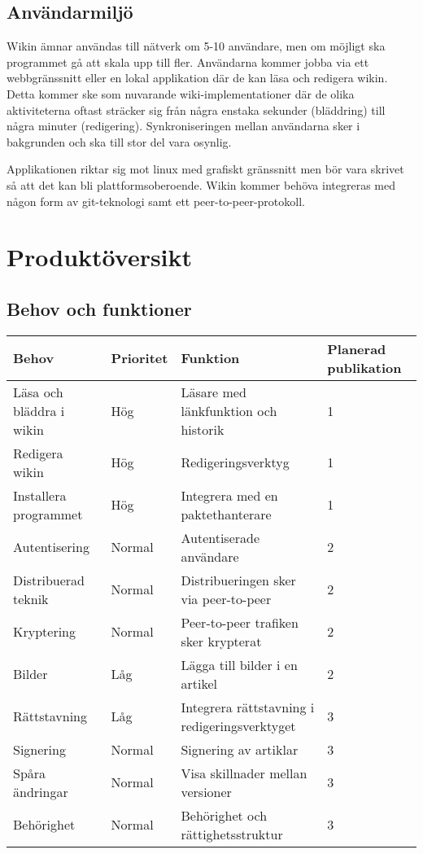 \subsection{Användarmiljö}
Wikin ämnar användas till nätverk om 5-10 användare, men om möjligt ska programmet gå att skala upp till fler. Användarna kommer jobba via ett webbgränssnitt eller en lokal applikation där de kan läsa och redigera wikin. Detta kommer ske som nuvarande wiki-implementationer där de olika aktiviteterna oftast sträcker sig från några enstaka sekunder (bläddring) till några minuter (redigering). Synkroniseringen mellan användarna sker i bakgrunden och ska till stor del vara osynlig.

Applikationen riktar sig mot linux med grafiskt gränssnitt men bör vara skrivet så att det kan bli plattformsoberoende. Wikin kommer behöva integreras med någon form av git-teknologi samt ett peer-to-peer-protokoll.
\section{Produktöversikt}
\subsection*{Behov och funktioner}
\begin{tabular}{|l|l|l|l|}
\hline
Behov & Prioritet & Funktion & Planerad publikation \\
\hline
Läsa och bläddra i wikin & Hög & Läsare med länkfunktion och historik & 1 \\
\hline
Redigera wikin & Hög & Redigeringsverktyg & 1 \\
\hline
Installera programmet & Hög & Integrera med en paktethanterare & 1 \\
\hline
Autentisering & Normal & Autentiserade användare & 2 \\
\hline
Distribuerad teknik & Normal & Distribueringen sker via peer-to-peer & 2 \\
\hline 
Kryptering & Normal & Peer-to-peer trafiken sker krypterat & 2 \\
\hline
Bilder & Låg & Lägga till bilder i en artikel & 2 \\
\hline
Rättstavning & Låg & Integrera rättstavning i redigeringsverktyget & 3 \\
\hline	
Signering & Normal & Signering av artiklar & 3 \\
\hline
Spåra ändringar & Normal & Visa skillnader mellan versioner & 3 \\
\hline
Behörighet & Normal & Behörighet och rättighetsstruktur & 3 \\
\hline
\end{tabular}
